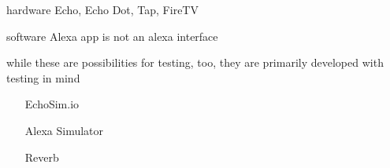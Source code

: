 hardware 
Echo, Echo Dot, Tap, FireTV

software
Alexa app is not an alexa interface

while these are possibilities for testing, too,  they are primarily developed with testing in mind
\begin{itemize}
	\item[EchoSim.io]
	\item[Alexa Simulator]
	\item[Reverb]
\end{itemize}








